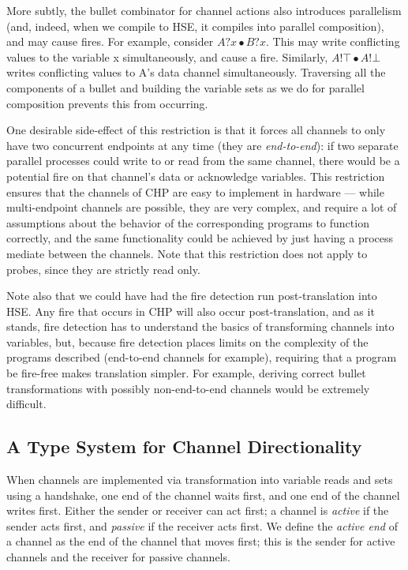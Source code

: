 \documentclass[times, 10pt]{article}
\begin{document}
More subtly, the bullet combinator for channel actions also introduces
parallelism (and, indeed, when we compile to HSE, it compiles into parallel
composition), and may cause fires.  For example, consider $A?x \bullet B?x$.
This may write conflicting values to the variable x simultaneously, and cause a
fire.  Similarly, $A!\top \bullet A!\bot$ writes conflicting values to A's data
channel simultaneously.  Traversing all the components of a bullet and building
the variable sets as we do for parallel composition prevents this from occurring.

One desirable side-effect of this restriction is that it forces all channels to
only have two concurrent endpoints at any time (they are \emph{end-to-end}):  if
two separate parallel processes could write to or read from the same channel,
there would be a potential fire on that channel's data or acknowledge variables.
This restriction ensures that the channels of CHP are easy to implement in
hardware --- while multi-endpoint channels are possible, they are very complex,
and require a lot of assumptions about the behavior of the corresponding
programs to function correctly, and the same functionality could be achieved by
just having a process mediate between the channels.  Note that this restriction
does not apply to probes, since they are strictly read only.

Note also that we could have had the fire detection run post-translation into
HSE.  Any fire that occurs in CHP will also occur post-translation, and as it
stands, fire detection has to understand the basics of transforming channels
into variables, but, because fire detection places limits on the complexity of
the programs described (end-to-end channels for example), requiring that a
program be fire-free makes translation simpler.  For example, deriving correct
bullet transformations with possibly non-end-to-end channels would be extremely
difficult.

\subsection{A Type System for Channel Directionality}

When channels are implemented via transformation into variable reads and sets
using a handshake, one end of the channel waits first, and one end of the
channel writes first.  Either the sender or receiver can act first; a channel is
\emph{active} if the sender acts first, and \emph{passive} if the receiver acts
first.  We define the \emph{active end} of a channel as the end of the channel
that moves first; this is the sender for active channels and the receiver for
passive channels.
\end{document}
